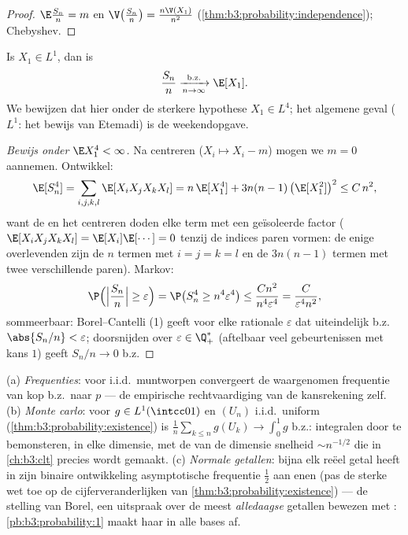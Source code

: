 \begin{proof}
$\E\frac{S_n}n = m$ en $\V\bigl(\frac{S_n}n\bigr) =
\frac{n\V(X_1)}{n^2}$
(\cref{thm:b3:probability:independence}); Chebyshev.
\end{proof}

\begin{theorem}
\label{thm:b3:probability:slln}
Is $X_1 \in L^1$, dan is
\[
\frac{S_n}{n} \xrightarrow[n\to\infty]{\text{b.z.}} \E[X_1].
\]
We bewijzen dat hier onder de sterkere hypothese $X_1 \in L^4$;
het algemene geval ($L^1$: het bewijs van Etemadi) is de
weekendopgave.
\end{theorem}

\begin{proof}[Bewijs onder $\E X_1^4 < \infty$]
Na centreren ($X_i \mapsto X_i - m$) mogen we $m = 0$ aannemen.
Ontwikkel:
\[
\E[S_n^4] = \sum_{i,j,k,l}\E[X_iX_jX_kX_l]
= n\,\E[X_1^4] + 3n(n-1)\,\bigl(\E[X_1^2]\bigr)^2 \leq
C\,n^2 ,
\]
want de  en het centreren doden elke term met
een geïsoleerde factor ($\E[X_iX_jX_kX_l] = \E[X_i]\E[\cdots] =
0$ tenzij de indices paren vormen: de enige overlevenden zijn de
$n$ termen met $i=j=k=l$ en de $3n(n-1)$ termen met twee
verschillende paren). Markov:
\[
\P\Bigl(\Bigl|\frac{S_n}n\Bigr| \geq \varepsilon\Bigr)
= \P\bigl(S_n^4 \geq n^4\varepsilon^4\bigr)
\leq \frac{Cn^2}{n^4\varepsilon^4} =
\frac{C}{\varepsilon^4n^2},
\]
sommeerbaar: Borel--Cantelli (1) geeft voor elke rationale
$\varepsilon$ dat uiteindelijk b.z.\ $\abs{S_n/n} < \varepsilon$;
doorsnijden over $\varepsilon \in \Q_+^*$ (aftelbaar veel
gebeurtenissen met kans $1$) geeft $S_n/n \to 0$ b.z.
\end{proof}

\begin{example}
\label{ex:b3:probability:sllnapps}
(a) \emph{Frequenties}: voor i.i.d.\ muntworpen convergeert de
waargenomen frequentie van kop b.z.\ naar $p$ --- de empirische
rechtvaardiging van de kansrekening zelf.
(b) \emph{Monte carlo}: voor $g \in
L^1(\intcc01)$ en $(U_n)$ i.i.d.\ uniform
(\cref{thm:b3:probability:existence}) is
$\frac1n\sum_{k\leq n}g(U_k) \to \int_0^1g$ b.z.: integralen door
te bemonsteren, in elke dimensie, met de van de dimensie
 snelheid $\sim n^{-1/2}$ die in \cref{ch:b3:clt}
precies wordt gemaakt.
(c) \emph{Normale getallen}: bijna elk reëel getal heeft in zijn
binaire ontwikkeling asymptotische frequentie $\frac12$ aan enen
(pas de sterke wet toe op de cijferveranderlijken van
\cref{thm:b3:probability:existence}) --- de stelling van Borel,
een uitspraak over de meest \emph{alledaagse} getallen bewezen
met : \cref{pb:b3:probability:1} maakt haar in alle bases
af.
\end{example}

